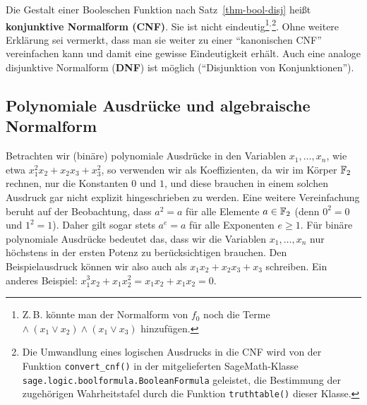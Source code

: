 \begin{refsegment}
Die Gestalt einer Booleschen Funktion nach Satz~\ref{thm-bool-disj}
heißt {\bf konjunktive Normalform
(CNF)}. Sie ist nicht eindeutig\footnote{%
  Z.\,B. könnte man der Normalform von $f_0$ noch die Terme
  $\wedge\: (x_1 \vee x_2) \wedge (x_1 \vee x_3)$ hinzufügen.
}$^,$\footnote{%
  Die Umwandlung eines logischen Ausdrucks in die CNF wird von der Funktion
  {\tt convert\_cnf()} in der mitgelieferten SageMath-Klasse
  {\tt sage.logic.boolformula.BooleanFormula} geleistet, die
  Bestimmung der zugehörigen Wahrheitstafel durch die Funktion
  {\tt truthtable()} dieser Klasse.
}.
Ohne weitere Erklärung sei vermerkt, dass man sie weiter zu einer "`kanonischen
CNF"' vereinfachen kann und damit eine gewisse Eindeutigkeit erhält.
Auch eine analoge disjunktive Normalform
({\bf DNF}) ist möglich ("`Disjunktion von Konjunktionen"').

\subsection{Polynomiale Ausdrücke und algebraische Normalform}\label{ss-bool-anf}

Betrachten wir (binäre) polynomiale
Ausdrücke in den Variablen $x_1, \ldots, x_n$,
wie etwa $x_1^2 x_2 + x_2 x_3 + x_3^2$, so verwenden wir als Koeffizienten,
da wir im Körper $\mathbb{F}_2$ rechnen, nur die Konstanten $0$ und $1$, und diese
brauchen in einem solchen Ausdruck gar nicht explizit hingeschrieben zu werden.
Eine weitere Vereinfachung beruht auf der Beobachtung, dass $a^2 = a$ für alle
Elemente $a \in \mathbb{F}_2$ (denn $0^2 = 0$ und $1^2 = 1$). Daher gilt sogar stets
$a^e = a$ für alle Exponenten $e \geq 1$. Für binäre polynomiale Ausdrücke
bedeutet das, dass wir die Variablen $x_1, \ldots, x_n$ nur höchstens in
der ersten Potenz zu berücksichtigen brauchen. Den Beispielausdruck können
wir also auch als $x_1 x_2 + x_2 x_3 + x_3$ schreiben.
Ein anderes Beispiel: $x_1^3 x_2 + x_1 x_2^2 = x_1 x_2 + x_1 x_2 = 0$.


\end{refsegment}
